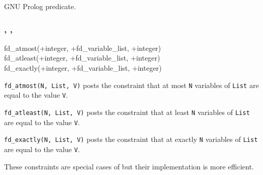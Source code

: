 \Portability

GNU Prolog predicate.

\subsubsection{,
               ,
               }

\begin{TemplatesOneCol}
fd\_atmost(+integer, +fd\_variable\_list, +integer)\\
fd\_atleast(+integer, +fd\_variable\_list, +integer)\\
fd\_exactly(+integer, +fd\_variable\_list, +integer)

\end{TemplatesOneCol}

\Description

\texttt{fd\_atmost(N, List, V)} posts the constraint that at most \texttt{N}
variables of \texttt{List} are equal to the value \texttt{V}.

\texttt{fd\_atleast(N, List, V)} posts the constraint that at least
\texttt{N} variables of \texttt{List} are equal to the value \texttt{V}.

\texttt{fd\_exactly(N, List, V)} posts the constraint that at exactly
\texttt{N} variables of \texttt{List} are equal to the value \texttt{V}.

These constraints are special cases of 
 but their implementation is more efficient.

\begin{PlErrors}








\end{PlErrors}


